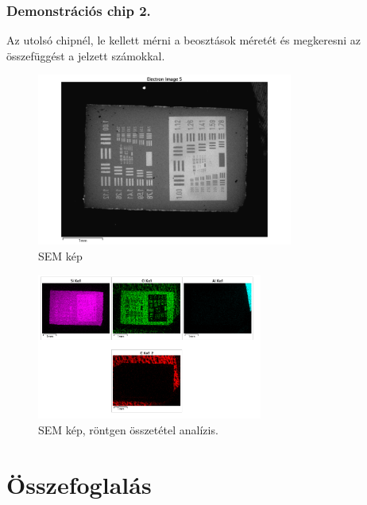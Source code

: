 \documentclass[a4paper,12pt]{article}
\begin{document}
\subsubsection{Demonstrációs chip 2.}

\par Az utolsó chipnél, le kellett mérni a beosztások méretét és
megkeresni az összefüggést a jelzett számokkal.

\begin{figure}[H]
	\centering
	\includegraphics[width=0.75\textwidth]{./Jcsop/chip2.png}
	\caption{SEM kép}
\end{figure}

\begin{figure}[H]
	\centering
	\includegraphics[width=0.66\textwidth]{./Jcsop/chip2rtg.png}
	\caption{SEM kép, röntgen összetétel analízis.}
\end{figure}

\section{Összefoglalás}
\end{document}
